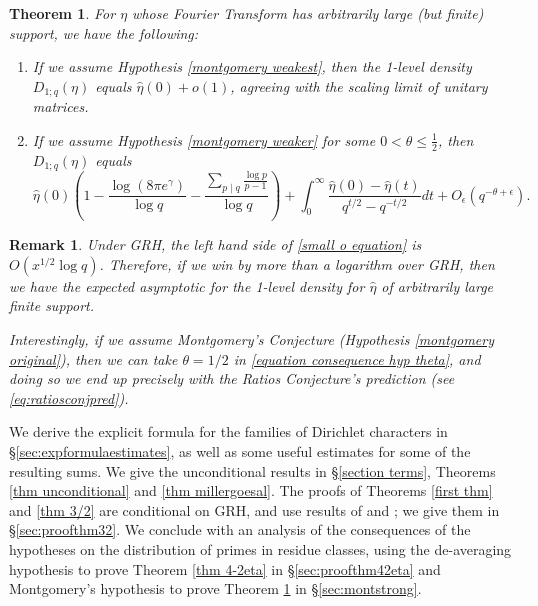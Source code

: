 \documentclass[12pt,reqno]{amsart}
\numberwithin{equation}{section}
\theoremstyle{plain}
\newtheorem{theorem}[thm]{Theorem}
\newtheorem{remark}[thm]{Remark}
\begin{document}
\begin{theorem}\label{strongest thm} For $\eta$ whose Fourier Transform has arbitrarily large (but finite) support, we have the following:

\begin{enumerate}

\item  If we assume Hypothesis \ref{montgomery weakest}, then the 1-level density $D_{1;q}(\eta)$ equals ${\widehat{\eta}}(0)+o(1)$, agreeing with the scaling limit of unitary matrices.

\item If we assume Hypothesis \ref{montgomery weaker} for some $0<\theta\leq \frac 12$, then $D_{1;q}(\eta)$ equals
\begin{equation}{\widehat{\eta}}(0) \left(  1-\frac { \log(8\pi e^{\gamma})}{\log q}-\frac{\sum_{p\mid q}\frac{\log p}{p-1}}{\log q}\right)
+\int_0^{\infty}\frac{{\widehat{\eta}}(0)-{\widehat{\eta}}(t)}{q^{t/2}-q^{-t/2}} dt +O_{\epsilon}(q^{-\theta+\epsilon}).
\label{equation consequence hyp theta}
 \end{equation}
\end{enumerate}
\end{theorem}

\begin{remark}
Under GRH, the left hand side of \eqref{small o equation} is $O(x^{1/2}\log q)$. Therefore, if we win by more than a logarithm over GRH, then we have the expected asymptotic for the 1-level density for ${\widehat{\eta}}$ of arbitrarily large finite support.

Interestingly, if we assume Montgomery's Conjecture (Hypothesis \ref{montgomery original}), then we can take $\theta=1/2$ in \eqref{equation consequence hyp theta}, and doing so we end up precisely with the Ratios Conjecture's prediction (see \eqref{eq:ratiosconjpred}).
\end{remark}

We derive the explicit formula for the families of Dirichlet characters in \S\ref{sec:expformulaestimates}, as well as some useful estimates for some of the resulting sums. We give the unconditional results in \S\ref{section terms}, Theorems \ref{thm unconditional} and \ref{thm millergoesal}. The proofs of Theorems \ref{first thm} and \ref{thm 3/2} are conditional on GRH, and use results of \cite{FG} and \cite{fiorilli}; we give them in \S\ref{sec:proofthm32}. We conclude with an analysis of the consequences of the hypotheses on the distribution of primes in residue classes, using the de-averaging hypothesis to prove Theorem \ref{thm 4-2eta} in \S\ref{sec:proofthm42eta} and Montgomery's hypothesis to prove Theorem \ref{strongest thm} in \S\ref{sec:montstrong}.
\end{document}
